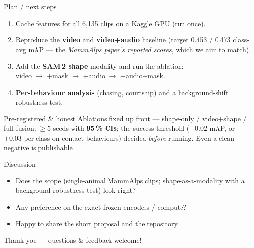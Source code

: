 \documentclass[aspectratio=169,11pt]{beamer}
\begin{document}
\begin{frame}{Plan / next steps}
  \begin{enumerate}
    \item Cache features for all 6{,}135 clips on a Kaggle GPU (run once).
    \item Reproduce the \textbf{video} and \textbf{video+audio} baseline
          (target 0.453 / 0.473 class-avg mAP --- the \emph{MammAlps paper's reported
          scores}, which we aim to match).
    \item Add the \textbf{SAM\,2 shape} modality and run the ablation:\\
          video $\rightarrow$ +mask $\rightarrow$ +audio $\rightarrow$ +audio+mask.
    \item \textbf{Per-behaviour analysis} (chasing, courtship) and a background-shift
          robustness test.
  \end{enumerate}
  \vfill
  \begin{block}{Pre-registered \& honest}
    Ablations fixed up front --- shape-only / video+shape / full fusion; $\geq 5$ seeds with
    \textbf{95\,\% CIs}; the success threshold ($+0.02$ mAP, or $+0.03$ per-class on contact
    behaviours) decided \emph{before} running. Even a clean negative is publishable.
  \end{block}
\end{frame}

\begin{frame}{Discussion}
  \begin{itemize}
    \item Does the scope (single-animal MammAlps clips; shape-as-a-modality with a
          background-robustness test) look right?
    \item Any preference on the exact frozen encoders / compute?
    \item Happy to share the short proposal and the repository.
  \end{itemize}
  \vfill
  \begin{center}
    \Large Thank you --- questions \& feedback welcome!
  \end{center}
\end{frame}
\end{document}

